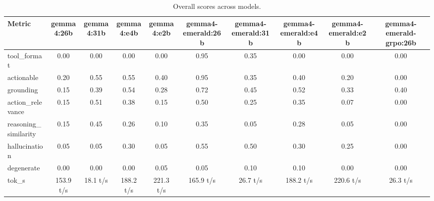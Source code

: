 \begin{table}[h]
\centering\small
\begin{tabular}{lccccccccc}
\toprule
Metric & gemma4:26b & gemma4:31b & gemma4:e4b & gemma4:e2b & gemma4-emerald:26b & gemma4-emerald:31b & gemma4-emerald:e4b & gemma4-emerald:e2b & gemma4-emerald-grpo:26b \\
\midrule
tool\_format & 0.00 & 0.00 & 0.00 & 0.00 & 0.95 & 0.35 & 0.00 & 0.00 & 0.00 \\
actionable & 0.20 & 0.55 & 0.55 & 0.40 & 0.95 & 0.35 & 0.40 & 0.20 & 0.00 \\
grounding & 0.15 & 0.39 & 0.54 & 0.28 & 0.72 & 0.45 & 0.52 & 0.33 & 0.40 \\
action\_relevance & 0.15 & 0.51 & 0.38 & 0.15 & 0.50 & 0.25 & 0.35 & 0.07 & 0.00 \\
reasoning\_similarity & 0.15 & 0.45 & 0.26 & 0.10 & 0.35 & 0.05 & 0.28 & 0.05 & 0.00 \\
hallucination & 0.05 & 0.05 & 0.30 & 0.05 & 0.55 & 0.50 & 0.30 & 0.25 & 0.00 \\
degenerate & 0.00 & 0.00 & 0.00 & 0.05 & 0.05 & 0.10 & 0.10 & 0.00 & 0.00 \\
tok\_s & 153.9 t/s & 18.1 t/s & 188.2 t/s & 221.3 t/s & 165.9 t/s & 26.7 t/s & 188.2 t/s & 220.6 t/s & 26.3 t/s \\
\bottomrule
\end{tabular}
\caption{Overall scores across models.}
\end{table}